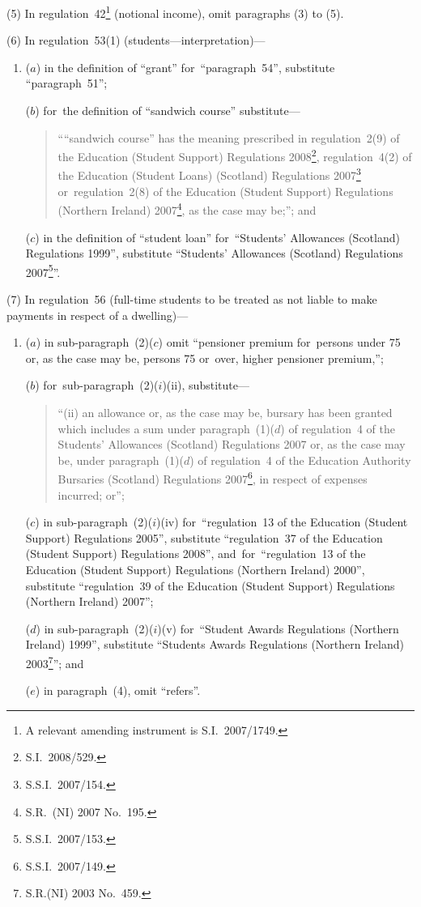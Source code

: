 \documentclass[12pt,a4paper]{article}
\begin{document}
(5) In regulation~42\footnote{A relevant amending instrument is S.I.~2007/1749.} (notional income), omit paragraphs (3) to (5).

(6) In regulation~53(1) (students---interpretation)—
\begin{enumerate}\item[]
($a$) in the definition of “grant” for~“paragraph~54”, substitute “paragraph~51”;

($b$) for~the definition of “sandwich course” substitute—
\begin{quotation}
““sandwich course” has the meaning prescribed in regulation~2(9) of the Education (Student Support) Regulations 2008\footnote{S.I.~2008/529.}, regulation~4(2) of the Education (Student Loans) (Scotland) Regulations 2007\footnote{S.S.I.~2007/154.} or~regulation~2(8) of the Education (Student Support) Regulations (Northern Ireland) 2007\footnote{S.R.~(NI) 2007 No.~195.}, as the case may be;”; and
\end{quotation}

($c$) in the definition of “student loan” for~“Students’ Allowances (Scotland) Regulations 1999”, substitute “Students’ Allowances (Scotland) Regulations 2007\footnote{S.S.I.~2007/153.}”.
\end{enumerate}

(7) In regulation~56 (full-time students to be treated as not liable to make payments in respect of a dwelling)—
\begin{enumerate}\item[]
($a$) in sub-paragraph~(2)($c$)  omit “pensioner premium for~persons under 75 or, as the case may be, persons 75 or~over, higher pensioner premium,”;

($b$) for~sub-paragraph~(2)($i$)(ii), substitute—
\begin{quotation}
“(ii) an allowance or, as the case may be, bursary has been granted which includes a sum under paragraph~(1)($d$)  of regulation~4 of the Students’ Allowances (Scotland) Regulations 2007 or, as the case may be, under paragraph~(1)($d$)  of regulation~4 of the Education Authority Bursaries (Scotland) Regulations 2007\footnote{S.S.I.~2007/149.}, in respect of expenses incurred; or”;
\end{quotation}

($c$) in sub-paragraph~(2)($i$)(iv) for~“regulation~13 of the Education (Student Support) Regulations 2005”, substitute “regulation~37 of the Education (Student Support) Regulations 2008”, and~for~“regulation~13 of the Education (Student Support) Regulations (Northern Ireland) 2000”, substitute “regulation~39 of the Education (Student Support) Regulations (Northern Ireland) 2007”;

($d$) in sub-paragraph~(2)($i$)(v) for~“Student Awards Regulations (Northern Ireland) 1999”, substitute “Students Awards Regulations (Northern Ireland) 2003\footnote{S.R.(NI) 2003 No.~459.}”; and

($e$) in paragraph~(4), omit “refers”.
\end{enumerate}
\end{document}
